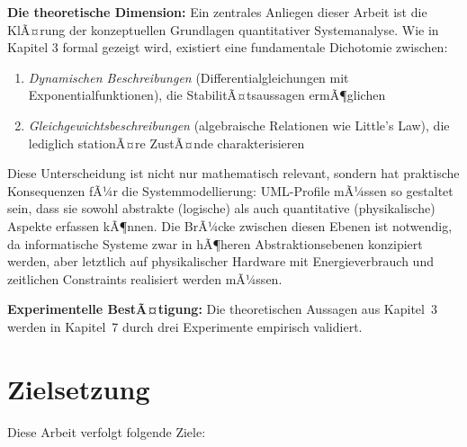 ﻿\documentclass[a4paper,12pt]{report}
\theoremstyle{definition}
\begin{document}
\textbf{Die theoretische Dimension:} Ein zentrales Anliegen dieser Arbeit ist die KlÃ¤rung der konzeptuellen Grundlagen quantitativer Systemanalyse. Wie in Kapitel 3 formal gezeigt wird, existiert eine fundamentale Dichotomie zwischen:

\begin{enumerate}
	\item[-] \textit{Dynamischen Beschreibungen} (Differentialgleichungen mit Exponentialfunktionen), die StabilitÃ¤tsaussagen ermÃ¶glichen
	\item[-] \textit{Gleichgewichtsbeschreibungen} (algebraische Relationen wie Little's Law), die lediglich stationÃ¤re ZustÃ¤nde charakterisieren
\end{enumerate}

Diese Unterscheidung ist nicht nur mathematisch relevant, sondern hat praktische Konsequenzen fÃ¼r die Systemmodellierung: UML-Profile mÃ¼ssen so gestaltet sein, dass sie sowohl abstrakte (logische) als auch quantitative (physikalische) Aspekte erfassen kÃ¶nnen. Die BrÃ¼cke zwischen diesen Ebenen ist notwendig, da informatische Systeme zwar in hÃ¶heren Abstraktionsebenen konzipiert werden, aber letztlich auf physikalischer Hardware mit Energieverbrauch und zeitlichen Constraints realisiert werden mÃ¼ssen.

\textbf{Experimentelle BestÃ¤tigung:} Die theoretischen Aussagen aus
Kapitel~3 werden in Kapitel~7 durch drei Experimente empirisch validiert.

\section{Zielsetzung}

Diese Arbeit verfolgt folgende Ziele:
\end{document}
